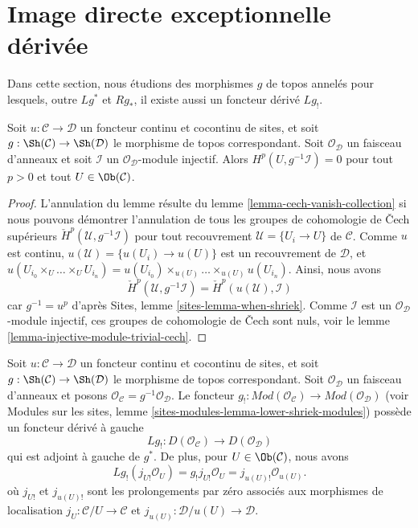 \section{Image directe exceptionnelle dérivée}
\label{section-derived-lower-shriek}

\noindent
Dans cette section, nous étudions des morphismes $g$ de topos annelés pour
lesquels, outre $Lg^*$ et $Rg_*$, il existe aussi un foncteur dérivé $Lg_!$.

\begin{lemma}
\label{lemma-pullback-injective-pre-limp}
Soit $u : \mathcal{C} \to \mathcal{D}$ un foncteur continu et cocontinu de
sites, et soit $g : \Sh(\mathcal{C}) \to \Sh(\mathcal{D})$ le morphisme de
topos correspondant. Soit $\mathcal{O}_\mathcal{D}$ un faisceau d'anneaux et
soit $\mathcal{I}$ un $\mathcal{O}_\mathcal{D}$-module injectif. Alors
$H^p(U, g^{-1}\mathcal{I}) = 0$ pour tout $p > 0$ et tout
$U \in \Ob(\mathcal{C})$.
\end{lemma}

\begin{proof}
L'annulation du lemme résulte du lemme
\ref{lemma-cech-vanish-collection} si nous pouvons démontrer l'annulation de
tous les groupes de cohomologie de {\v C}ech supérieurs
$\check H^p(\mathcal{U}, g^{-1}\mathcal{I})$
pour tout recouvrement $\mathcal{U} = \{U_i \to U\}$ de $\mathcal{C}$.
Comme $u$ est continu, $u(\mathcal{U}) = \{u(U_i) \to u(U)\}$ est un
recouvrement de $\mathcal{D}$, et
$u(U_{i_0} \times_U \ldots \times_U U_{i_n}) =
u(U_{i_0}) \times_{u(U)} \ldots \times_{u(U)} u(U_{i_n})$.
Ainsi, nous avons
$$
\check H^p(\mathcal{U}, g^{-1}\mathcal{I}) =
\check H^p(u(\mathcal{U}), \mathcal{I})
$$
car $g^{-1} = u^p$ d'après Sites, lemme \ref{sites-lemma-when-shriek}.
Comme $\mathcal{I}$ est un $\mathcal{O}_\mathcal{D}$-module injectif, ces
groupes de cohomologie de {\v C}ech sont nuls, voir le
lemme \ref{lemma-injective-module-trivial-cech}.
\end{proof}

\begin{lemma}
\label{lemma-existence-derived-lower-shriek}
Soit $u : \mathcal{C} \to \mathcal{D}$ un foncteur continu et cocontinu de
sites, et soit $g : \Sh(\mathcal{C}) \to \Sh(\mathcal{D})$ le morphisme de
topos correspondant. Soit $\mathcal{O}_\mathcal{D}$ un faisceau d'anneaux et
posons
$\mathcal{O}_\mathcal{C} = g^{-1}\mathcal{O}_\mathcal{D}$.
Le foncteur $g_! : \textit{Mod}(\mathcal{O}_\mathcal{C}) \to
\textit{Mod}(\mathcal{O}_\mathcal{D})$
(voir Modules sur les sites, lemme
\ref{sites-modules-lemma-lower-shriek-modules}) possède un foncteur dérivé à
gauche
$$
Lg_! : D(\mathcal{O}_\mathcal{C}) \longrightarrow D(\mathcal{O}_\mathcal{D})
$$
qui est adjoint à gauche de $g^*$. De plus, pour
$U \in \Ob(\mathcal{C})$, nous avons
$$
Lg_!(j_{U!}\mathcal{O}_U) =
g_!j_{U!}\mathcal{O}_U =
j_{u(U)!} \mathcal{O}_{u(U)}.
$$
où $j_{U!}$ et $j_{u(U)!}$ sont les prolongements par zéro associés aux
morphismes de localisation $j_U : \mathcal{C}/U \to \mathcal{C}$ et
$j_{u(U)} : \mathcal{D}/u(U) \to \mathcal{D}$.
\end{lemma}

